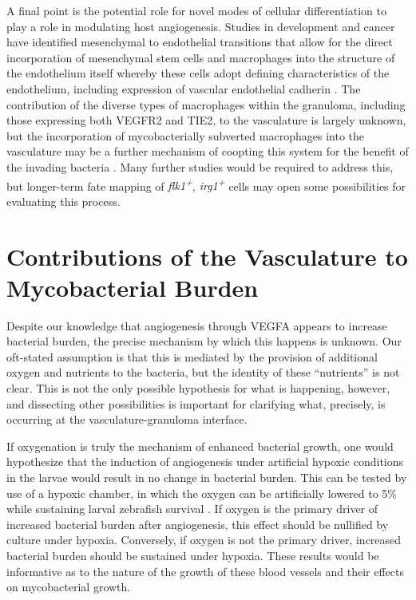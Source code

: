 A final point is the potential role for novel modes of cellular differentiation to play a role in modulating host angiogenesis. Studies in development and cancer have identified mesenchymal to endothelial transitions that allow for the direct incorporation of mesenchymal stem cells and macrophages into the structure of the endothelium itself whereby these cells adopt defining characteristics of the endothelium, including expression of vascular endothelial cadherin \citep{Ubil2014, Wu2007, Zhang2008b}. The contribution of the diverse types of macrophages within the granuloma, including those expressing both VEGFR2 and TIE2, to the vasculature is largely unknown, but the incorporation of mycobacterially subverted macrophages into the vasculature may be a further mechanism of coopting this system for the benefit of the invading bacteria \citep{deCortie2014, Hall2012}. Many further studies would be required to address this, but longer\hyp{}term fate mapping of \textit{flk1\textsuperscript{+}}, \textit{irg1\textsuperscript{+}} cells may open some possibilities for evaluating this process.

\section{Contributions of the Vasculature to Mycobacterial Burden}

Despite our knowledge that angiogenesis through VEGFA appears to increase bacterial burden, the precise mechanism by which this happens is unknown. Our oft-stated assumption is that this is mediated by the provision of additional oxygen and nutrients to the bacteria, but the identity of these ``nutrients'' is not clear. This is not the only possible hypothesis for what is happening, however, and dissecting other possibilities is important for clarifying what, precisely, is occurring at the vasculature-granuloma interface. 

If oxygenation is truly the mechanism of enhanced bacterial growth, one would hypothesize that the induction of angiogenesis under artificial hypoxic conditions in the larvae would result in no change in bacterial burden. This can be tested by use of a hypoxic chamber, in which the oxygen can be artificially lowered to 5\% while sustaining larval zebrafish survival \citep{Rombough2009, Long2015}. If oxygen is the primary driver of increased bacterial burden after angiogenesis, this effect should be nullified by culture under hypoxia. Conversely, if oxygen is not the primary driver, increased bacterial burden should be sustained under hypoxia. These results would be informative as to the nature of the growth of these blood vessels and their effects on mycobacterial growth.

